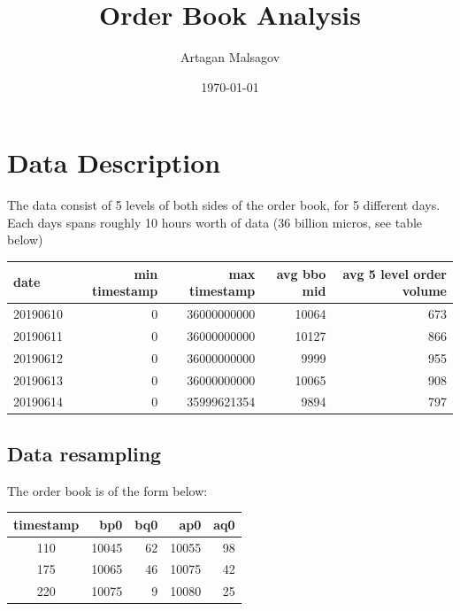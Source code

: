 \documentclass[english, 11pt, a4paper]{article}
\begin{document}
\baselineskip18pt


\title{Order Book Analysis}

\author{Artagan Malsagov}

\date{\today}


\maketitle


\section{Data Description}

The data consist of 5 levels of both sides of the order book, for 5 different days.
Each days spans roughly 10 hours worth of data (36 billion micros, see table below)

\begin{table}[H]
    \centering
    \begin{tabular}{lrrrr}
    \toprule
    date & min timestamp & max timestamp & avg bbo mid & avg 5 level order volume \\
    \midrule
    20190610 & 0 & 36000000000 & 10064 & 673 \\
    20190611 & 0 & 36000000000 & 10127 & 866 \\
    20190612 & 0 & 36000000000 & 9999 & 955 \\
    20190613 & 0 & 36000000000 & 10065 & 908 \\
    20190614 & 0 & 35999621354 & 9894 & 797 \\
    \bottomrule
    \end{tabular}
    \label{tab2}
\end{table}


\subsection{Data resampling}
The order book is of the form below:

\begin{table}[H]
    \centering
    \begin{tabular}{crrrr}
    \toprule
    timestamp & bp0 & bq0 & ap0 & aq0 \\
    \midrule
    110 & 10045& 62 & 10055 & 98 \\
    175 & 10065& 46 & 10075 & 42 \\
    220 & 10075& 9 & 10080 & 25 \\
    \bottomrule
    \end{tabular}
    \label{tab2}
\end{table}
\end{document}

